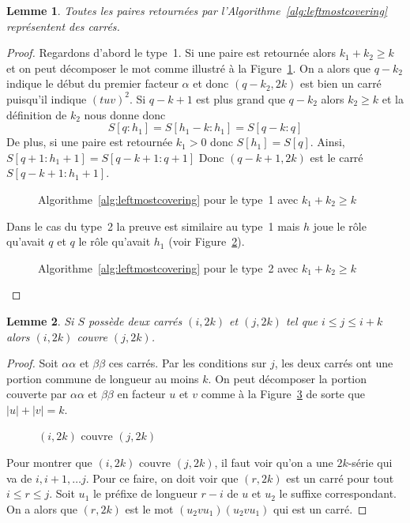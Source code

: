 \documentclass[10pt,letterpaper,oneside]{article}
\newtheorem{lemme}{Lemme}
\begin{document}
\begin{lemme}
    Toutes les paires retournées par l'Algorithme~\ref{alg:leftmostcovering} représentent des carrés.
\end{lemme}

\begin{proof}
    Regardons d'abord le type~1. Si une paire est retournée alors $k_1+k_2\geq  k$ et on peut décomposer le mot comme illustré à la Figure~\ref{fig:phase1a}. On a alors que $q-k_2$ indique le début du premier facteur $\alpha$ et donc $(q-k_2,2k)$ est bien un carré puisqu'il indique $(tuv)^2$. Si $q-k+1$ est plus grand que $q-k_2$ alors $k_2\geq k$ et la définition de $k_2$ nous donne donc
    $$S[q:h_1]=S[h_1-k:h_1]=S[q-k:q]$$
    De plus, si une paire est retournée $k_1>0$ donc $S[h_1]=S[q]$. Ainsi, $S[q+1:h_1+1]=S[q-k+1:q+1]$
    Donc $(q-k+1,2k)$ est le carré $S[q-k+1:h_1+1]$.
    \begin{figure}[htb]
        \centering
        
        \caption{Algorithme~\ref{alg:leftmostcovering} pour le type~1 avec $k_1+k_2\geq k$} \label{fig:phase1a}
    \end{figure}
    
    Dans le cas du type~2 la preuve est similaire au type~1 mais $h$ joue le rôle qu'avait $q$ et $q$ le rôle qu'avait $h_1$ (voir Figure~\ref{fig:phase1b}).
    \begin{figure}[htb]
        \centering
        
        \caption{Algorithme~\ref{alg:leftmostcovering} pour le type~2 avec $k_1+k_2\geq k$} \label{fig:phase1b}
    \end{figure}
\end{proof}

\begin{lemme}\label{lem:couvre}
    Si $S$ possède deux carrés $(i,2k)$ et $(j,2k)$ tel que $i\leq j\leq i+k$ alors $(i,2k)$ couvre $(j,2k)$.
\end{lemme}

\begin{proof}
    Soit $\alpha\alpha$ et $\beta\beta$ ces carrés.
    Par les conditions sur $j$, les deux carrés ont une portion commune de longueur au moins $k$. On peut décomposer la portion couverte par $\alpha\alpha$ et $\beta\beta$ en facteur $u$ et $v$ comme à la Figure~\ref{fig:cover} de sorte que $|u|+|v|=k$.
    \begin{figure}[htb]
        \centering
        
        \caption{$(i,2k)$ couvre $(j,2k)$} \label{fig:cover}
    \end{figure}
    Pour montrer que $(i,2k)$ couvre $(j,2k)$, il faut voir qu'on a une $2k$-série qui va de $i,i+1,\dots j$. Pour ce faire, on doit voir que $(r,2k)$ est un carré pour tout $i\leq r\leq j$. Soit $u_1$ le préfixe de longueur $r-i$ de $u$ et $u_2$ le suffixe correspondant. On a alors que $(r,2k)$ est le mot $(u_2vu_1)(u_2vu_1)$ qui est un carré.
\end{proof}
\end{document}
